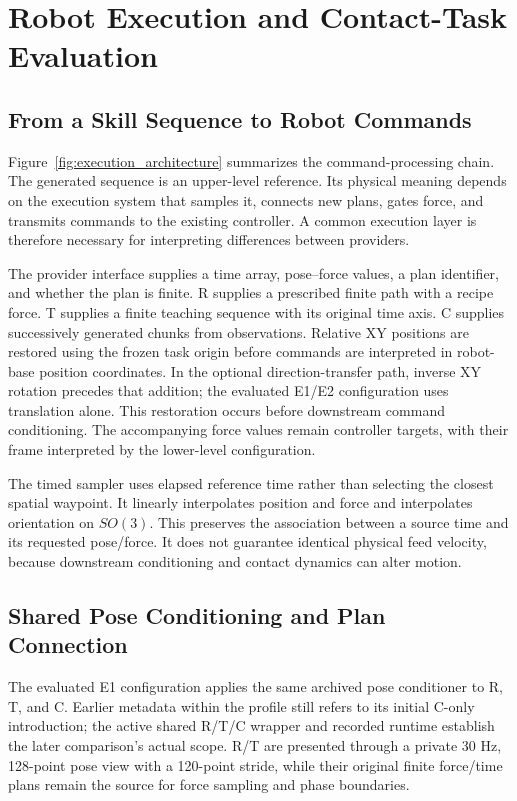 \chapter{Robot Execution and Contact-Task Evaluation}
\label{chap:execution}

\section{From a Skill Sequence to Robot Commands}
Figure~\ref{fig:execution_architecture} summarizes the command-processing chain.
The generated sequence is an upper-level reference. Its physical meaning depends on the execution system that samples it, connects new plans, gates force, and transmits commands to the existing controller. A common execution layer is therefore necessary for interpreting differences between providers.

The provider interface supplies a time array, pose--force values, a plan identifier, and whether the plan is finite. R supplies a prescribed finite path with a recipe force. T supplies a finite teaching sequence with its original time axis. C supplies successively generated chunks from observations. Relative XY positions are restored using the frozen task origin before commands are interpreted in robot-base position coordinates. In the optional direction-transfer path, inverse XY rotation precedes that addition; the evaluated E1/E2 configuration uses translation alone. This restoration occurs before downstream command conditioning. The accompanying force values remain controller targets, with their frame interpreted by the lower-level configuration.

The timed sampler uses elapsed reference time rather than selecting the closest spatial waypoint. It linearly interpolates position and force and interpolates orientation on \(SO(3)\). This preserves the association between a source time and its requested pose/force. It does not guarantee identical physical feed velocity, because downstream conditioning and contact dynamics can alter motion.

\section{Shared Pose Conditioning and Plan Connection}
The evaluated E1 configuration applies the same archived pose conditioner to R, T, and C. Earlier metadata within the profile still refers to its initial C-only introduction; the active shared R/T/C wrapper and recorded runtime establish the later comparison's actual scope. R/T are presented through a private 30 Hz, 128-point pose view with a 120-point stride, while their original finite force/time plans remain the source for force sampling and phase boundaries.


